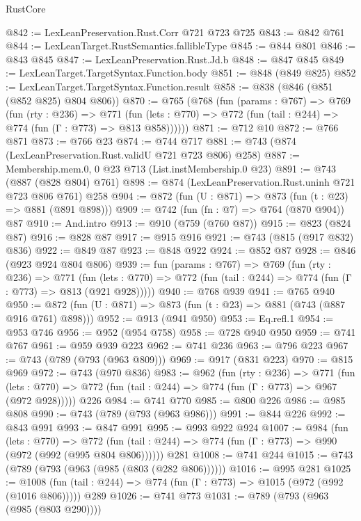 \begin{lexlean}{RustCore}
\begin{coremodule}
@842 := LexLeanPreservation.Rust.Corr @721 @723 @725
@843 := @842 @761
@844 := LexLeanTarget.RustSemantics.fallibleType
@845 := @844 @801
@846 := @843 @845
@847 := LexLeanPreservation.Rust.Jd.b
@848 := @847 @845
@849 := LexLeanTarget.TargetSyntax.Function.body
@851 := @848 (@849 @825)
@852 := LexLeanTarget.TargetSyntax.Function.result
@858 := @838 (@846 (@851 (@852 @825) @804 @806))
@870 := @765
    (@768
      (fun (params : @767) =>
      @769
        (fun (rty : @236) =>
        @771
          (fun (lets : @770) => @772 (fun (tail : @244) => @774 (fun (Γ : @773) => @813 @858))))))
@871 := @712 @10
@872 := @766 @871
@873 := @766 @23
@874 := @744 @717
@881 := @743 (@874 (LexLeanPreservation.Rust.validU @721 @723 @806) @258)
@887 := Membership.mem.{0, 0} @23 @713 (List.instMembership.{0} @23)
@891 := @743 (@887 (@828 @804) @761)
@898 := @874 (LexLeanPreservation.Rust.uninh @721 @723 @806 @761) @258
@904 := @872 (fun (U : @871) => @873 (fun (t : @23) => @881 (@891 @898)))
@909 := @742 (fun (fn : @7) => @764 (@870 @904)) @87
@910 := And.intro
@913 := @910 (@759 (@760 @87))
@915 := @823 (@824 @87)
@916 := @828 @87
@917 := @915 @916
@921 := @743 (@815 (@917 @832) @836)
@922 := @849 @87
@923 := @848 @922
@924 := @852 @87
@928 := @846 (@923 @924 @804 @806)
@939 := fun (params : @767) =>
  @769
    (fun (rty : @236) =>
    @771
      (fun (lets : @770) => @772 (fun (tail : @244) => @774 (fun (Γ : @773) => @813 (@921 @928)))))
@940 := @768 @939
@941 := @765 @940
@950 := @872 (fun (U : @871) => @873 (fun (t : @23) => @881 (@743 (@887 @916 @761) @898)))
@952 := @913 (@941 @950)
@953 := Eq.refl.{1}
@954 := @953 @746
@956 := @952 (@954 @758)
@958 := @728 @940 @950
@959 := @741 @767
@961 := @959 @939 @223
@962 := @741 @236
@963 := @796 @223
@967 := @743 (@789 (@793 (@963 @809)))
@969 := @917 (@831 @223)
@970 := @815 @969
@972 := @743 (@970 @836)
@983 := @962
    (fun (rty : @236) =>
    @771
      (fun (lets : @770) => @772 (fun (tail : @244) => @774 (fun (Γ : @773) => @967 (@972 @928)))))
    @226
@984 := @741 @770
@985 := @800 @226
@986 := @985 @808
@990 := @743 (@789 (@793 (@963 @986)))
@991 := @844 @226
@992 := @843 @991
@993 := @847 @991
@995 := @993 @922 @924
@1007 := @984
    (fun (lets : @770) =>
    @772 (fun (tail : @244) => @774 (fun (Γ : @773) => @990 (@972 (@992 (@995 @804 @806))))))
    @281
@1008 := @741 @244
@1015 := @743 (@789 (@793 (@963 (@985 (@803 (@282 @806))))))
@1016 := @995 @281
@1025 := @1008 (fun (tail : @244) => @774 (fun (Γ : @773) => @1015 (@972 (@992 (@1016 @806))))) @289
@1026 := @741 @773
@1031 := @789 (@793 (@963 (@985 (@803 @290))))

\end{coremodule}
\end{lexlean}
